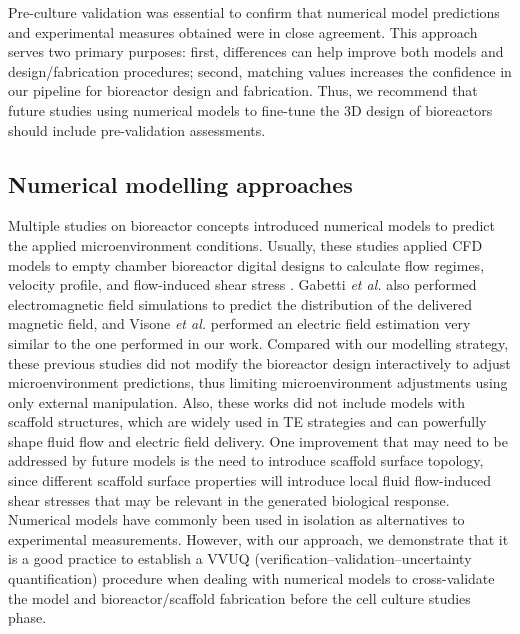 Pre-culture validation was essential to confirm that numerical model predictions and experimental measures obtained were in close agreement. This approach serves two primary purposes: first, differences can help improve both models and design/fabrication procedures; second, matching values increases the confidence in our pipeline for bioreactor design and fabrication. Thus, we recommend that future studies using numerical models to fine-tune the 3D design of bioreactors should include pre-validation assessments.


\subsection{Numerical modelling approaches}
Multiple studies on bioreactor concepts introduced numerical models to predict the applied microenvironment conditions. Usually, these studies applied \acs{CFD} models to empty chamber bioreactor digital designs to calculate flow regimes, velocity profile, and flow-induced shear stress \cite{Smith2018-he, Daneshgar2019-tu, Gabetti2022-hp, Rosser2018-zg, Schmid2018-rg, Visone2018-sa, Lim2019-gx}. Gabetti \textit{et al.} \cite{Gabetti2022-hp} also performed electromagnetic field simulations to predict the distribution of the delivered magnetic field, and Visone \textit{et al.} \cite{Visone2018-sa} performed an electric field estimation very similar to the one performed in our work. Compared with our modelling strategy, these previous studies did not modify the bioreactor design interactively to adjust microenvironment predictions, thus limiting microenvironment adjustments using only external manipulation. Also, these works did not include models with scaffold structures, which are widely used in \acs{TE} strategies and can powerfully shape fluid flow and electric field delivery. One improvement that may need to be addressed by future models is the need to introduce scaffold surface topology, since different scaffold surface properties will introduce local fluid flow-induced shear stresses that may be relevant in the generated biological response. Numerical models have commonly been used in isolation as alternatives to experimental measurements. However, with our approach, we demonstrate that it is a good practice to establish a VVUQ (verification–validation–uncertainty quantification) procedure when dealing with numerical models to cross-validate the model and bioreactor/scaffold fabrication before the cell culture studies phase.


